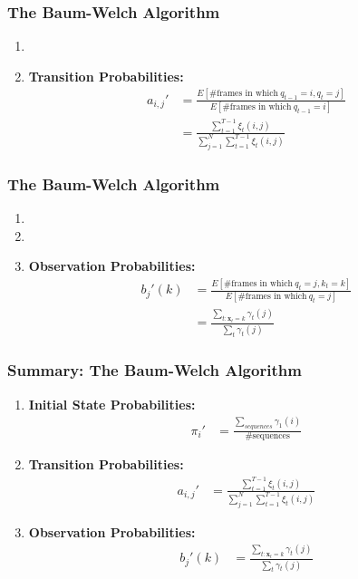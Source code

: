 \documentclass{beamer}
\begin{document}
\begin{frame}
  \frametitle{The Baum-Welch Algorithm}

  \begin{enumerate}
  \item 
  \item {\bf Transition Probabilities:}
    \begin{align*}
      a_{i,j}'&=\frac{E\left[\mbox{\# frames in which}~q_{t-1}=i,q_t=j\right]}{E\left[\mbox{\# frames in which}~q_{t-1}=i\right]}\\
      &=\frac{\sum_{t=1}^{T-1} \xi_t(i,j)}{\sum_{j=1}^N\sum_{t=1}^{T-1}\xi_t(i,j)}
    \end{align*}
  \end{enumerate}
\end{frame}

\begin{frame}
  \frametitle{The Baum-Welch Algorithm}

  \begin{enumerate}
  \item
  \item 
  \item {\bf Observation Probabilities:} 
    \begin{align*}
      b_{j}'(k) &=\frac{E\left[\mbox{\# frames in which}~q_{t}=j,k_t=k\right]}{E\left[\mbox{\# frames in which}~q_{t}=j\right]}\\
      &=\frac{\sum_{t:\mathbf{x}_t=k} \gamma_t(j)}{\sum_{t}\gamma_t(j)}
    \end{align*}
  \end{enumerate}
\end{frame}

\begin{frame}
  \frametitle{Summary: The Baum-Welch Algorithm}

  \begin{enumerate}
  \item {\bf Initial State Probabilities:}
    \begin{align*}
      \pi_i'      &=\frac{\sum_{sequences} \gamma_1(i)}{\mbox{\# sequences}}
    \end{align*}
  \item {\bf Transition Probabilities:}
    \begin{align*}
      a_{i,j}' &=\frac{\sum_{t=1}^{T-1} \xi_t(i,j)}{\sum_{j=1}^N\sum_{t=1}^{T-1}\xi_t(i,j)}
    \end{align*}
  \item {\bf Observation Probabilities:} 
    \begin{align*}
      b_{j}'(k)       &=\frac{\sum_{t:\mathbf{x}_t=k} \gamma_t(j)}{\sum_{t}\gamma_t(j)}
    \end{align*}
  \end{enumerate}
\end{frame}
\end{document}
